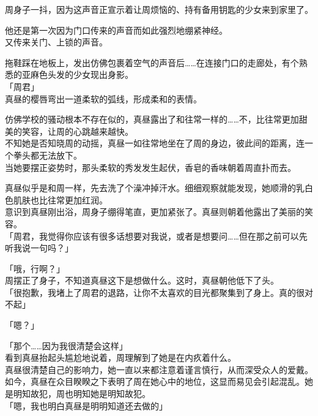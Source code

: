 周身子一抖，因为这声音正宣示着让周烦恼的、持有备用钥匙的少女来到家里了。

他还是第一次因为门口传来的声音而如此强烈地绷紧神经。\\

又传来关门、上锁的声音。

拖鞋踩在地板上，发出仿佛包裹着空气的声音后……在连接门口的走廊处，有个熟悉的亚麻色头发的少女现出身影。\\

「周君」\\

真昼的樱唇弯出一道柔软的弧线，形成柔和的表情。

仿佛学校的骚动根本不存在似的，真昼露出了和往常一样的……不，比往常更加甜美的笑容，让周的心跳越来越快。\\

不知她是否知晓周的动摇，真昼一如往常地坐在了周的身边，彼此间的距离，连一个拳头都无法放下。\\

当她要摆正姿势时，那头柔软的秀发发生起伏，香皂的香味朝着周直扑而去。

真昼似乎是和周一样，先去洗了个澡冲掉汗水。细细观察就能发现，她顺滑的乳白色肌肤也比往常更加红润。\\

意识到真昼刚出浴，周身子绷得笔直，更加紧张了。真昼则朝着他露出了美丽的笑容。\\

「周君，我觉得你应该有很多话想要对我说，或者是想要问……但在那之前可以先听我说一句吗？」

「哦，行啊？」\\

周摆正了身子，不知道真昼这下是想做什么。这时，真昼朝他低下了头。\\

「很抱歉，我堵上了周君的退路，让你不太喜欢的目光都聚集到了身上。真的很对不起」

「嗯？」

「那个……因为我很清楚会这样」\\

看到真昼抬起头尴尬地说着，周理解到了她是在内疚着什么。\\

真昼很清楚自己的影响力，她一直以来都注意着谨言慎行，从而深受众人的爱戴。如今，真昼在众目睽睽之下表明了周在她心中的地位，这显而易见会引起混乱。她是明知故犯，周也明知她是明知故犯。\\

「嗯，我也明白真昼是明明知道还去做的」

